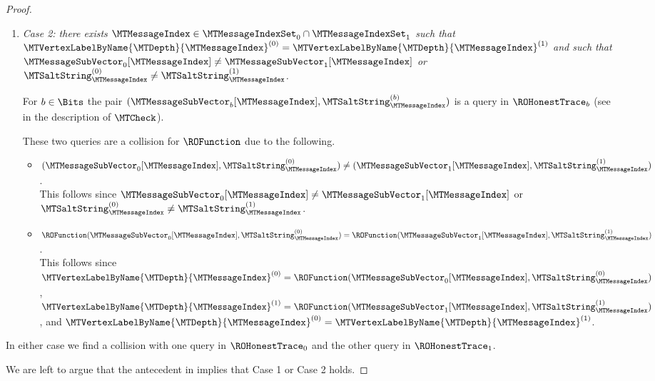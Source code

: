 \begin{proof}
\begin{enumerate}
\begin{itemize}[nosep]
\end{itemize}

  \item \emph{Case 2: there exists $\MTMessageIndex \in \MTMessageIndexSet_{0} \cap \MTMessageIndexSet_{1}$ such that $\MTVertexLabelByName{\MTDepth}{\MTMessageIndex}^{(0)}=\MTVertexLabelByName{\MTDepth}{\MTMessageIndex}^{(1)}$ and such that $\MTMessageSubVector_{0}[\MTMessageIndex] \neq \MTMessageSubVector_{1}[\MTMessageIndex]$ or $\MTSaltString_{\MTMessageIndex}^{(0)} \neq \MTSaltString_{\MTMessageIndex}^{(1)}$.}

For $b \in \Bits$ the pair $(\MTMessageSubVector_{b}[\MTMessageIndex],\MTSaltString_{\MTMessageIndex}^{(b)})$ is a query in $\ROHonestTrace_{b}$ (see  in the description of $\MTCheck$).

These two queries are a collision for $\ROFunction$ due to the following.
\begin{itemize}[nosep]
  \item $(\MTMessageSubVector_{0}[\MTMessageIndex],\MTSaltString_{\MTMessageIndex}^{(0)}) \neq (\MTMessageSubVector_{1}[\MTMessageIndex],\MTSaltString_{\MTMessageIndex}^{(1)})$. \\ This follows since $\MTMessageSubVector_{0}[\MTMessageIndex] \neq \MTMessageSubVector_{1}[\MTMessageIndex]$ or $\MTSaltString_{\MTMessageIndex}^{(0)} \neq \MTSaltString_{\MTMessageIndex}^{(1)}$.
  \item $\ROFunction(\MTMessageSubVector_{0}[\MTMessageIndex],\MTSaltString_{\MTMessageIndex}^{(0)})=\ROFunction(\MTMessageSubVector_{1}[\MTMessageIndex],\MTSaltString_{\MTMessageIndex}^{(1)})$. \\ This follows since $\MTVertexLabelByName{\MTDepth}{\MTMessageIndex}^{(0)} = \ROFunction(\MTMessageSubVector_{0}[\MTMessageIndex],\MTSaltString_{\MTMessageIndex}^{(0)})$, $\MTVertexLabelByName{\MTDepth}{\MTMessageIndex}^{(1)} = \ROFunction(\MTMessageSubVector_{1}[\MTMessageIndex],\MTSaltString_{\MTMessageIndex}^{(1)})$, and $\MTVertexLabelByName{\MTDepth}{\MTMessageIndex}^{(0)}=\MTVertexLabelByName{\MTDepth}{\MTMessageIndex}^{(1)}$.
\end{itemize}

\end{enumerate}
In either case we find a collision with one query in $\ROHonestTrace_{0}$ and the other query in $\ROHonestTrace_{1}$.

We are left to argue that the antecedent in  implies that Case 1 or Case 2 holds.


\end{proof}

